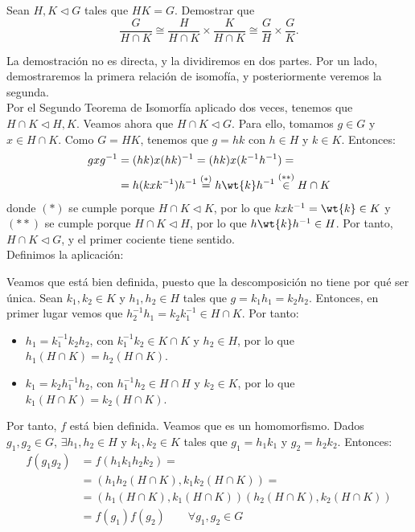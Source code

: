\begin{ejercicio}
    Sean $H,K\lhd G$ tales que $HK=G$. Demostrar que
    \[
        \frac{G}{H\cap K}\cong \frac{H}{H\cap K}\times \frac{K}{H\cap K}\cong \frac{G}{H}\times \frac{G}{K}.
    \]

    La demostración no es directa, y la dividiremos en dos partes. Por un lado, demostraremos la primera relación de isomofía, y posteriormente veremos la segunda.\\

    Por el Segundo Teorema de Isomorfía aplicado dos veces, tenemos que $H\cap K\lhd H,K$. Veamos ahora que $H\cap K\lhd G$. Para ello, tomamos $g\in G$ y $x\in H\cap K$. Como $G=HK$, tenemos que $g=hk$ con $h\in H$ y $k\in K$. Entonces:
    \begin{align*}
        gxg^{-1} &= (hk)x(hk)^{-1} = (hk)x(k^{-1}h^{-1}) =\\&= h(kxk^{-1})h^{-1} \stackrel{(\ast)}{=} h\wt{k}h^{-1}\stackrel{(\ast\ast)}{\in} H\cap K
    \end{align*}
    donde $(\ast)$ se cumple porque $H\cap K\lhd K$, por lo que $kxk^{-1}=\wt{k}\in K$ y $(\ast\ast)$ se cumple porque $H\cap K\lhd H$, por lo que $h\wt{k}h^{-1}\in H$. Por tanto, $H\cap K\lhd G$, y el primer cociente tiene sentido.\\

    Definimos la aplicación:

    Veamos que está bien definida, puesto que la descomposición no tiene por qué ser única. Sean $k_1,k_2\in K$ y $h_1,h_2\in H$ tales que $g=k_1h_1=k_2h_2$. Entonces, en primer lugar vemos que $h_2^{-1}h_1 = k_2k_1^{-1}\in H\cap K$. Por tanto:
    \begin{itemize}
        \item $h_1=k_1^{-1}k_2h_2$, con $k_1^{-1}k_2\in K\cap K$ y $h_2\in H$, por lo que $h_1(H\cap K)=h_2(H\cap K)$.
        \item $k_1=k_2h_1^{-1}h_2$, con $h_1^{-1}h_2\in H\cap H$ y $k_2\in K$, por lo que $k_1(H\cap K)=k_2(H\cap K)$.
    \end{itemize}
    Por tanto, $f$ está bien definida. Veamos que es un homomorfismo.
    Dados $g_1,g_2\in G$, $\exists h_1,h_2\in H$ y $k_1,k_2\in K$ tales que $g_1=h_1k_1$ y $g_2=h_2k_2$. Entonces:
    \begin{align*}
        f(g_1g_2) &= f(h_1k_1h_2k_2) =\\&= (h_1h_2(H\cap K),k_1k_2(H\cap K)) =\\&= (h_1(H\cap K),k_1(H\cap K))(h_2(H\cap K),k_2(H\cap K))\\
        &= f(g_1)f(g_2)\qquad \forall g_1,g_2\in G
    \end{align*}


\end{ejercicio}
